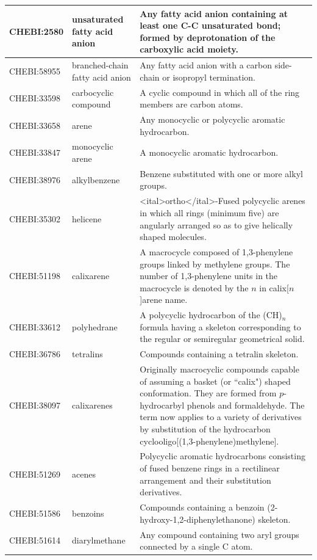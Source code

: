 \documentclass[10pt]{bmc_article}
\newenvironment{bmcformat}{\baselineskip20pt\sloppy\setboolean{publ}{false}}{\baselineskip20pt\sloppy}
\begin{document}
\begin{bmcformat}
{\begin{tabular}{|l|l|p{8cm}|}
CHEBI:2580  &  unsaturated fatty acid anion  &  Any fatty acid anion containing at least one C-C unsaturated bond; formed by deprotonation of the carboxylic acid moiety. \\ \hline
CHEBI:58955  &  branched-chain fatty acid anion  &  Any fatty acid anion with a carbon side-chain or isopropyl termination. \\ \hline
CHEBI:33598  &  carbocyclic compound  &  A cyclic compound in which all of the ring members are carbon atoms.\\ \hline
CHEBI:33658  &  arene  &  Any monocyclic or polycyclic aromatic hydrocarbon. \\ \hline
CHEBI:33847  &  monocyclic arene  &  A monocyclic aromatic hydrocarbon. \\ \hline
CHEBI:38976  &  alkylbenzene  &  Benzene substituted with one or more alkyl groups. \\ \hline
CHEBI:35302  &  helicene  &  <ital>ortho</ital>-Fused polycyclic arenes in which all rings (minimum five) are angularly arranged so as to give helically shaped molecules. \\ \hline
CHEBI:51198  &  calixarene  &  A macrocycle composed of 1,3-phenylene groups linked by methylene groups. The number of 1,3-phenylene units in the macrocycle is denoted by the $n$ in calix[$n$]arene name. \\ \hline
CHEBI:33612  &  polyhedrane  &  A polycyclic hydrocarbon of the (CH)$_n$ formula having a skeleton corresponding to the regular or semiregular geometrical solid. \\ \hline
CHEBI:36786  &  tetralins  &  Compounds containing a tetralin skeleton.\\ \hline
CHEBI:38097  &  calixarenes  &  Originally macrocyclic compounds capable of assuming a basket (or ``calix") shaped conformation. They are formed from $p$-hydrocarbyl phenols and formaldehyde. The term now applies to a variety of derivatives by substitution of the hydrocarbon cyclo{oligo[(1,3-phenylene)methylene]}. \\ \hline
CHEBI:51269  &  acenes  &  Polycyclic aromatic hydrocarbons consisting of fused benzene rings in a rectilinear arrangement and their substitution derivatives. \\ \hline
CHEBI:51586  &  benzoins  &  Compounds containing a benzoin (2-hydroxy-1,2-diphenylethanone) skeleton. \\ \hline
CHEBI:51614  &  diarylmethane  &  Any compound containing two aryl groups connected by a single C atom. \\ \hline
      \end{tabular}
      } 




\end{bmcformat}
\end{document}
